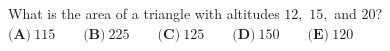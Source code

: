 What is the area of a triangle with altitudes $12,$ $15,$ and $20$?$\textbf{(A)}~115\qquad\textbf{(B)}~225\qquad\textbf{(C)}~125\qquad\textbf{(D)}~150\qquad\textbf{(E)}~120\qquad$
